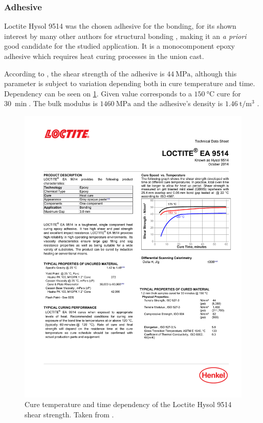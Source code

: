 \documentclass[cmfonts]{witpress}
\begin{document}
\subsubsection{Adhesive}
Loctite Hysol 9514 \cite{manufCatalog} was the chosen adhesive for the bonding, for its shown interest by many other authors for structural bonding \cite{Sadowski2010, Scattina2011, SernaMoreno2015}, making it an \textit{a priori} good candidate for the studied application. It is a monocomponent epoxy adhesive which requires heat curing processes in the union cast.

According to \cite{manufCatalog}, the shear strength of the adhesive is $\SI{44}{\MPa}$, although this parameter is subject to variation depending both in cure temperature and time. Dependency can be seen on \cref{fig:catalog_temp}. Given value corresponds to a $\SI{150}{\celsius}$ cure for $\SI{30}{\min}$. The bulk modulus is $\SI{1460}{\MPa}$ and the adhesive's density is $\SI{1.46}{\tonne/\m^3}$ \cite{manufCatalog}.

\begin{figure}
	\centering
	\includegraphics[width=0.7\linewidth]{figures/IMG_CUTRES/catalog_temp}
	\caption[Cure temperature and time dependency of the Loctite Hysol 9514 shear strength.]{Cure temperature and time dependency of the Loctite Hysol 9514 shear strength. Taken from \cite{manufCatalog}.}
	\label{fig:catalog_temp}
\end{figure}
\end{document}
